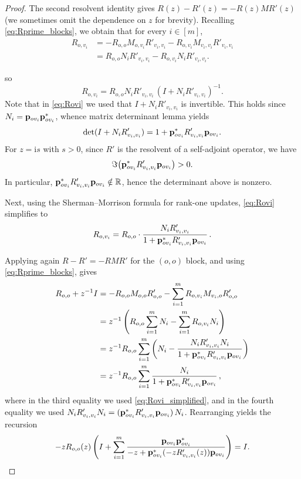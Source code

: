 \documentclass[reqno,english]{amsart}
\numberwithin{equation}{section}
\theoremstyle{definition}{
\newtheorem{example}[theorem]{Example}
\newtheorem{definition}[theorem]{Definition}
\newtheorem*{definition*}{Definition}
\newtheorem{problem}[theorem]{Problem}
\newtheorem{question}[theorem]{Question}
}
\newcommand{\R}{\mathbb R}
\newcommand{\ii}{\mathrm{i}}
\newcommand{\p}{{\bf p}}
\begin{document}
\begin{proof}
The second resolvent identity gives $R(z)-R'(z)=-R(z)MR'(z)$ (we sometimes omit the dependence on $z$ for brevity). 
Recalling \eqref{eq:Rprime_blocks}, we obtain that for every $i\in[m]$,
\begin{align*}
R_{o,v_i}
&=-R_{o,o}M_{o,v_i}R'_{v_i,v_i}-R_{o,v_i}M_{v_i,v_i}R'_{v_i,v_i}\\
&=R_{o,o}N_iR'_{v_i,v_i}-R_{o,v_i}N_iR'_{v_i,v_i}.
\end{align*}

so
\begin{equation}\label{eq:Rovi}
R_{o,v_i}=R_{o,o}N_iR'_{v_i,v_i}\,(I+N_iR'_{v_i,v_i})^{-1}.
\end{equation}
Note that in \eqref{eq:Rovi} we used that $I+N_iR'_{v_i,v_i}$ is invertible. This holds since $N_i=\p_{ov_i}\p_{ov_i}^*$, whence matrix determinant lemma yields
\[
\det(I+N_iR'_{v_i,v_i})=1+\p_{ov_i}^*R'_{v_i,v_i}\p_{ov_i}.
\]
For $z=\ii s$ with $s>0$, since $R'$ is the resolvent of a self-adjoint operator, we have
\[
\Im\bigl(\p_{ov_i}^*R'_{v_i,v_i}\p_{ov_i}\bigr)>0.
\]
In particular, $\p_{ov_i}^*R'_{v_i,v_i}\p_{ov_i}\notin\R$,
hence the determinant above is nonzero.  

Next, using the Sherman--Morrison formula for rank-one updates, \eqref{eq:Rovi} simplifies to
\begin{equation}\label{eq:Rovi_simplified}
R_{o,v_i}
=
R_{o,o}\cdot \frac{N_iR'_{v_i,v_i}}{1+\p_{ov_i}^*R'_{v_i,v_i}\p_{ov_i}}\,.
\end{equation}

Applying again $R-R'=-RMR'$ for the $(o,o)$ block, and using \eqref{eq:Rprime_blocks}, gives
\begin{align*}
R_{o,o}+z^{-1}I
&=-R_{o,o}M_{o,o}R'_{o,o}-\sum_{i=1}^m R_{o,v_i}M_{v_i,o}R'_{o,o}\\
&=z^{-1}\left(R_{o,o}\sum_{i=1}^m N_i-\sum_{i=1}^m R_{o,v_i}N_i\right)\\
&=z^{-1}R_{o,o}\sum_{i=1}^m\left(N_i-\frac{N_iR'_{v_i,v_i}N_i}{1+\p_{ov_i}^*R'_{v_i,v_i}\p_{ov_i}}\right)\\
&=z^{-1}R_{o,o}\sum_{i=1}^m\frac{N_i}{1+\p_{ov_i}^*R'_{v_i,v_i}\p_{ov_i}}\,,
\end{align*}
where in the third equality we used \eqref{eq:Rovi_simplified}, and in the fourth equality we used
$N_iR'_{v_i,v_i}N_i=(\p_{ov_i}^*R'_{v_i,v_i}\p_{ov_i})\,N_i$.
Rearranging yields the recursion
\begin{equation}\label{eq:recursion}
-zR_{o,o}(z)\left(I+\sum_{i=1}^m\frac{\p_{ov_i}\p_{ov_i}^*}{-z+\p_{ov_i}^*(-zR'_{v_i,v_i}(z))\p_{ov_i}}\right)=I.
\end{equation}


\end{proof}
\end{document}
